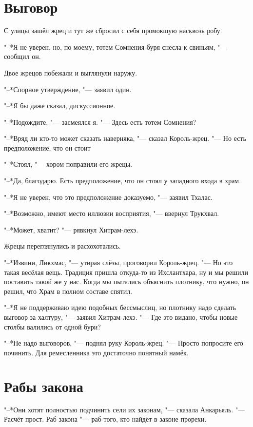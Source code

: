 \documentclass[a4paper,10pt,fleqn]{book}
\newcommand{\ldotst}{\so{...}\xspace}
\begin{document}
\section{Выговор}

С улицы зашёл жрец и тут же сбросил с себя промокшую насквозь робу.

"--*Я не уверен, но, по-моему, тотем Сомнения буря снесла к свиньям, "--- сообщил он.

Двое жрецов побежали и выглянули наружу.

"--*Спорное утверждение, "--- заявил один.

"--*Я бы даже сказал, дискуссионное.

"--*Подождите, "--- засмеялся я.
"--- Здесь есть тотем Сомнения?

"--*Вряд ли кто-то может сказать наверняка, "--- сказал Король-жрец.
"--- Но есть предположение, что он стоит\ldotst

"--*Стоял, "--- хором поправили его жрецы.

"--*Да, благодарю.
Есть предположение, что он стоял у западного входа в храм.

"--*Я не уверен, что это предположение доказуемо, "--- заявил Тхалас.

"--*Возможно, имеют место иллюзии восприятия, "--- ввернул Трукхвал.

"--*Может, хватит? "--- рявкнул Хитрам-лехэ.

Жрецы переглянулись и расхохотались.

"--*Извини, Ликхмас, "--- утирая слёзы, проговорил Король-жрец.
"--- Но это такая весёлая вещь.
Традиция пришла откуда-то из Ихслантхара, ну и мы решили поставить такой же у нас.
Когда мы пытались объяснить плотнику, что нужно, он решил, что Храм в полном составе спятил.

"--*Я не поддерживаю идею подобных бессмыслиц, но плотнику надо сделать выговор за халтуру, "--- заявил Хитрам-лехэ.
"--- Где это видано, чтобы новые столбы валились от одной бури?

"--*Не надо выговоров, "--- поднял руку Король-жрец.
"--- Просто попросите его починить.
Для ремесленника это достаточно понятный намёк.

\section{Рабы закона}

"--*Они хотят полностью подчинить сели их законам, "--- сказала Анкарьяль.
"--- Расчёт прост.
Раб закона "--- раб того, кто найдёт в законе прорехи.
\end{document}
